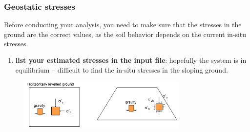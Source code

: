 \documentclass[notes]{beamer}
\begin{document}
\begin{frame}
\frametitle{Geostatic stresses}
Before conducting your analysis, you need to make sure that the stresses in the
ground are the correct values, as the soil behavior depends on the current
in-situ stresses.

\begin{enumerate}
	\item \textbf{list your estimated stresses in the input file}: hopefully the system is in equilibrium
	-- difficult to find the in-situ stresses in the sloping ground.
\end{enumerate}	

\begin{figure}[ht]
	\centering
	\includegraphics[width=0.75\textwidth]{figs/geostatic-stresses-initial-guess.png}
\end{figure}
\end{frame}

\end{document}
